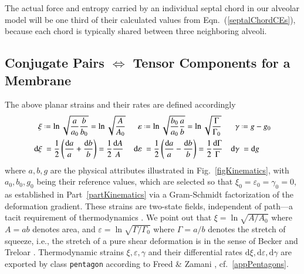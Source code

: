 The actual force and entropy carried by an individual septal chord in our alveolar model will be one third of their calculated values from Eqn.~(\ref{septalChordCEs}), because each chord is typically shared between three neighboring alveoli.

\subsection{Conjugate Pairs $\Longleftrightarrow$ Tensor Components for a Membrane}
\label{secConjugatePairs}

The above planar strains and their rates are defined accordingly \cite{Freedetal17}
\begin{subequations}
    \label{conjugateStrains}
    \begin{align}
    \xi & \defeq \ln \sqrt{\frac{a}{a_0} \frac{b}{b_0}} = 
    \ln \sqrt{\frac{A}{A_0}} &
    \varepsilon & \defeq \ln \sqrt{\frac{b_0}{a_0} \frac{a}{b}} = 
    \ln \sqrt{\frac{\Gamma}{\Gamma_0}} &
    \gamma & \defeq g - g_0 \label{thermoStrains3} \\
    \mathrm{d} \xi & \hspace{2.5pt} = \frac{1}{2} 
    \left( \frac{\mathrm{d} a}{a} + \frac{\mathrm{d} b}{b} \right) = 
    \frac{1}{2} \frac{\mathrm{d} A}{A} &
    \mathrm{d} \varepsilon & \hspace{2.5pt} = \frac{1}{2} 
    \left( \frac{\mathrm{d}a}{a} - \frac{\mathrm{d}b}{b} \right) = 
    \frac{1}{2} \frac{\mathrm{d} \Gamma}{\Gamma} & 
    \mathrm{d} \gamma & \hspace{2.5pt} = \mathrm{d} g
    \label{thermoStrainRates3} 
    \end{align}
\end{subequations}
where $a, b, g$ are the physical attributes illustrated in Fig.~\ref{figKinematics}, with $a_0 , b_0 , g_0$ being their reference values, which are selected so that $\xi_0 = \varepsilon_0 = \gamma_0 = 0$, as established in Part~\ref{partKinematics} via a Gram-Schmidt factorization of the deformation gradient.  These strains are two-state fields, independent of path---a tacit requirement of thermo\-dynamics \cite{Caratheodory09}.  We point out that $\xi = \ln \sqrt{A / A_0}$ where $A = ab$ denotes area, and $\varepsilon = \ln \sqrt{\Gamma / \Gamma_0}$ where $\Gamma = a/b$ denotes the stretch of squeeze, i.e., the stretch of a pure shear deformation is in the sense of Becker \cite{Becker93} and Treloar \cite{Treloar75}. Thermo\-dynamic strains $\xi , \varepsilon , \gamma$ and their differential rates $\mathrm{d} \xi , \mathrm{d} \varepsilon , \mathrm{d} \gamma$ are exported by class \texttt{pentagon} according to Freed \& Zamani \cite{FreedZamani18}, cf.\ \ref{appPentagons}.

